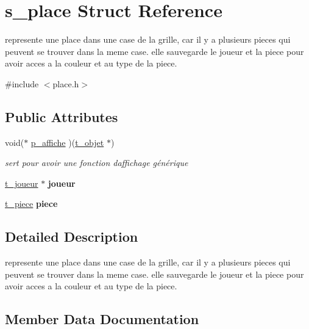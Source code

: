 \hypertarget{structs__place}{}\section{s\+\_\+place Struct Reference}
\label{structs__place}


represente une place dans une case de la grille, car il y a plusieurs pieces qui peuvent se trouver dans la meme case. elle sauvegarde le joueur et la piece pour avoir acces a la couleur et au type de la piece.  




{\ttfamily \#include $<$place.\+h$>$}

\subsection*{Public Attributes}
\begin{DoxyCompactItemize}
\item 
void($\ast$ \hyperlink{structs__place_a3876d28b2a22e373f0f820d723ef4dbd}{p\+\_\+affiche} )(\hyperlink{structs__objet}{t\+\_\+objet} $\ast$)
\begin{DoxyCompactList}\small\item\em sert pour avoir une fonction d\textquotesingle{}affichage générique \end{DoxyCompactList}\item 
\hyperlink{structs__joueur}{t\+\_\+joueur} $\ast$ {\bfseries joueur}\hypertarget{structs__place_a26ca4dd2cdea77b6ee35ea17ae421276}{}\label{structs__place_a26ca4dd2cdea77b6ee35ea17ae421276}

\item 
\hyperlink{joueur_8h_abaae233af7d7c466ecddef6f4567ea1f}{t\+\_\+piece} {\bfseries piece}\hypertarget{structs__place_af5aa0e667018aa18e2c199d59e4273cd}{}\label{structs__place_af5aa0e667018aa18e2c199d59e4273cd}

\end{DoxyCompactItemize}


\subsection{Detailed Description}
represente une place dans une case de la grille, car il y a plusieurs pieces qui peuvent se trouver dans la meme case. elle sauvegarde le joueur et la piece pour avoir acces a la couleur et au type de la piece. 

\subsection{Member Data Documentation}
